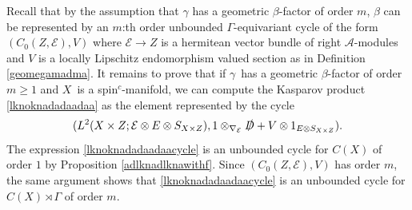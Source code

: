 \documentclass[a4paper,reqno]{amsart}
\numberwithin{equation}{section}
\theoremstyle{definition}
\theoremstyle{remark}
\begin{document}
Recall that by the assumption that $\gamma$ has a geometric $\beta$-factor of order $m$, $\beta$ can be represented by an $m$:th order unbounded $\Gamma$-equivariant cycle of the form $(C_0(Z,\mathcal{E}),V)$ where $\mathcal{E}\to Z$ is a hermitean vector bundle of right $\mathcal{A}$-modules and $V$ is a locally Lipschitz endomorphism valued section as in Definition \ref{geomegamadma}. It remains to prove that if $\gamma$ has a geometric $\beta$-factor of order $m\geq 1$ and $X$ is a spin$^c$-manifold, we can compute the Kasparov product \eqref{lknoknadadaadaa} as the element represented by the cycle 
\begin{equation}
\label{lknoknadadaadaacycle}
(L^2(X\times Z;\mathcal{E}\otimes E\otimes S_{X\times Z} ),1\otimes_{\nabla_\mathcal{E}}\slashed{D}+V\otimes 1_{E\otimes S_{X\times Z}}).
\end{equation}
The expression \eqref{lknoknadadaadaacycle} is an unbounded cycle for $C(X)$ of order $1$ by Proposition \ref{adlknadlknawithf}. Since $(C_0(Z,\mathcal{E}),V)$ has order $m$, the same argument shows that \eqref{lknoknadadaadaacycle} is an unbounded cycle for $C(X)\rtimes \Gamma$ of order $m$. 
\end{document}
